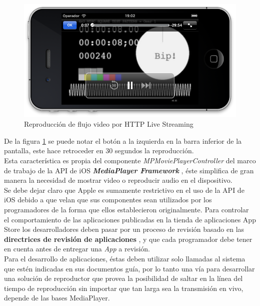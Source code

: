 \begin{figure}[h!]
	\centering
	\includegraphics[scale=0.55]{imgs/sshot_iOS_hls.png}
	\caption{Reproducción de flujo video por HTTP Live Streaming}
	\label{sshot_iOS_hls}	
\end{figure}

De la figura \ref{sshot_iOS_hls} se puede notar el botón a la izquierda en la barra inferior de  la pantalla, este hace retroceder en 30 segundos la reproducción.\\

Esta característica es propia del componente \textit{MPMoviePlayerController} del marco de trabajo de la API de iOS \textit{\textbf{MediaPlayer Framework}} \cite{cap1:mediaplayerframework}, éste simplifica de gran manera la necesidad de mostrar video o reproducir audio en el dispositivo.\\

\enlargethispage{2\baselineskip}
Se debe dejar claro que Apple es sumamente restrictivo en el uso de la API de iOS debido a que velan que sus componentes sean utilizados por los programadores de la forma que ellos establecieron originalmente. Para controlar el comportamiento de las aplicaciones publicadas en la tienda de aplicaciones App Store los desarrolladores deben pasar por un proceso de revisión basado en las \textbf{directrices de revisión de aplicaciones} \cite{cap1:appstoreguidelines}, y que cada programador debe tener en cuenta antes de entregar una \textit{App} a revisión.\\

Para el desarrollo de aplicaciones, éstas deben utilizar solo llamadas al sistema que estén indicadas en sus documentos guía, por lo tanto una vía para desarrollar una solución de reproductor que provea la posibilidad de saltar en la línea del tiempo de reproducción sin importar que tan larga sea la transmisión en vivo, depende de las bases MediaPlayer. \\

